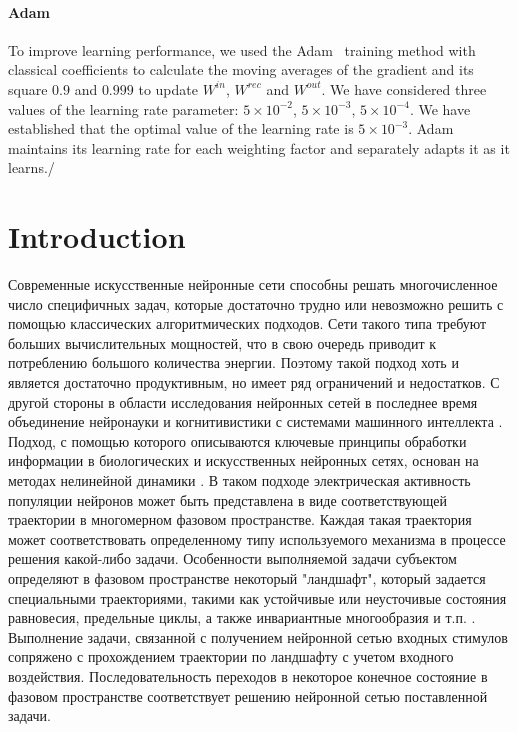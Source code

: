 \documentclass{article}
\begin{document}
\paragraph{Adam}
To improve learning performance, we used the Adam~\cite{kingma2014adam, Goodfellow-et-al-2016} training method  with classical coefficients to calculate the moving averages of the gradient and its square $0.9$ and $0.999$ to update $W^{in}$, $W^{rec}$ and $W^{out}$. We have considered three values of the learning rate parameter: $5\times 10^{-2}$, $5\times 10^{-3}$, $5 \times 10^{-4}$. We have established that the optimal value of the learning rate is $5\times 10^{-3}$. Adam maintains its learning rate for each weighting factor and separately adapts it as it learns./ 
\section{Introduction}
Современные искусственные нейронные сети \cite{Goodfellow-et-al-2016} способны решать многочисленное число специфичных задач, которые достаточно трудно или невозможно решить с помощью классических алгоритмических подходов. Сети такого типа требуют больших вычислительных мощностей, что в свою очередь приводит к потреблению большого количества энергии. Поэтому такой подход хоть и является достаточно продуктивным, но имеет ряд ограничений и недостатков. С другой стороны в области исследования нейронных сетей в последнее время объединение нейронауки и когнитивистики с системами машинного интеллекта \cite{richards2019deep}. Подход, с помощью которого описываются ключевые принципы обработки информации в биологических и искусственных нейронных сетях, основан на методах нелинейной динамики \cite{vyas2020computation}. В таком подходе электрическая активность популяции нейронов может быть представлена в виде соответствующей траектории в многомерном фазовом пространстве. Каждая такая траектория может соответствовать определенному типу используемого механизма в процессе решения какой-либо задачи. Особенности выполняемой задачи субъектом определяют в фазовом пространстве некоторый "ландшафт", который задается специальными траекториями, такими как устойчивые или неусточивые состояния равновесия, предельные циклы, а также инвариантные многообразия и т.п. \cite{rabinovich2012information, rabinovich2012principles}. Выполнение задачи, связанной с получением нейронной сетью входных стимулов сопряжено с прохождением траектории по ландшафту с учетом входного воздействия. Последовательность переходов в некоторое конечное состояние в фазовом пространстве соответствует решению нейронной сетью поставленной задачи.
\end{document}
